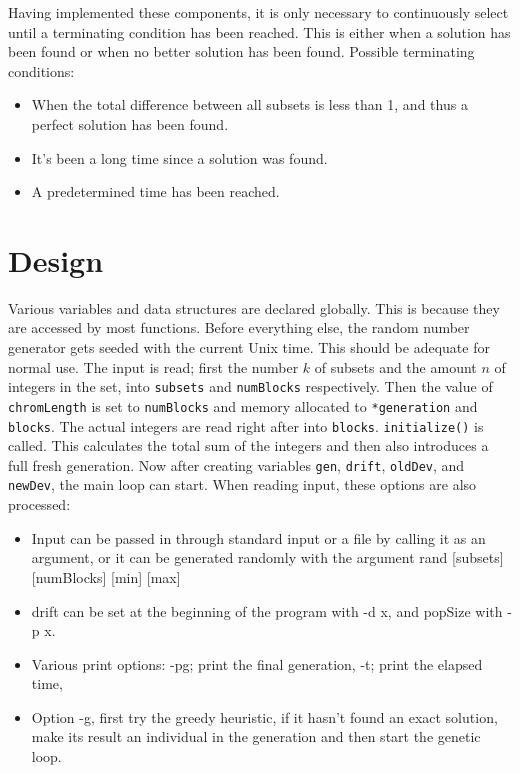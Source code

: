 \documentclass[a4paper,10pt]{article}
\begin{document}
Having implemented these components, it is only necessary to continuously select until a terminating condition has been reached.
This is either when a solution has been found or when no better solution has been found.
Possible terminating conditions:
\begin{itemize}
\item When the total difference between all subsets is less than 1, and thus a perfect solution has been found.
\item It's been a long time since a solution was found.
\item A predetermined time has been reached.
\end{itemize}

\section{Design}
Various variables and data structures are declared globally. This is because they are accessed by most functions.
Before everything else, the random number generator gets seeded with the current Unix time.
This should be adequate for normal use.
The input is read; first the number $k$ of subsets and the amount $n$ of integers in the set, into {\tt subsets} and {\tt numBlocks} respectively.
Then the value of {\tt chromLength} is set to {\tt numBlocks} and memory allocated to {\tt **generation} and {\tt *blocks}.
The actual integers are read right after into {\tt blocks}.
{\tt initialize()} is called. This calculates the total sum of the integers and then also introduces a full fresh generation.
Now after creating variables {\tt gen}, {\tt drift}, {\tt oldDev}, and {\tt newDev}, the main loop can start.
\newline 
\newline
When reading input, these options are also processed:
\begin{itemize}
  \item Input can be passed in through standard input or a file by calling it as an argument, or it can be generated randomly with the argument rand [subsets] [numBlocks] [min] [max]
  \item drift can be set at the beginning of the program with -d x, and popSize with -p x.
  \item Various print options: -pg; print the final generation, -t; print the elapsed time, 
  \item Option -g, first try the greedy heuristic, if it hasn't found an exact solution, make its result an individual in the generation and then start the genetic loop.
\end{itemize}
\end{document}
